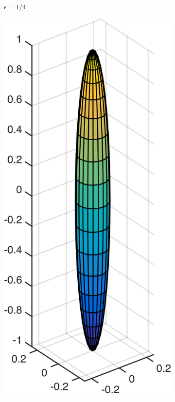 \begin{figure}[!htbp]
\begin{subfigure}[h]{0.24\textwidth}
    \caption{$\epsilon=1/4$}\label{fig:slenderness_1_4}
  \end{subfigure}
  \begin{subfigure}[h]{0.24\textwidth}
    \centering
    \includegraphics[width=\textwidth]{img/slender/1_10.png}

\end{subfigure}
\end{figure}
